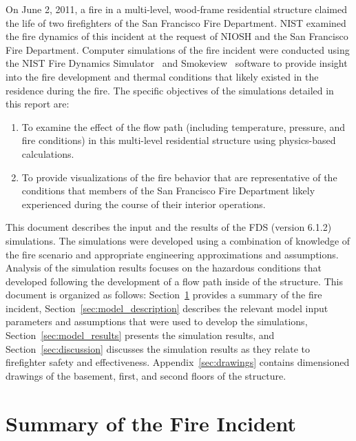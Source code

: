 \documentclass[12pt,oneside]{book}
\begin{document}
On June 2, 2011, a fire in a multi-level, wood-frame residential structure claimed the life of two firefighters of the San Francisco Fire Department. NIST examined the fire dynamics of this incident at the request of NIOSH and the San Francisco Fire Department. Computer simulations of the fire incident were conducted using the NIST Fire Dynamics Simulator~\cite{FDS_Users_Guide} and Smokeview~\cite{Smokeview_Users_Guide} software to provide insight into the fire development and thermal conditions that likely existed in the residence during the fire. The specific objectives of the simulations detailed in this report are: 
\begin{enumerate}
\item To examine the effect of the flow path (including temperature, pressure, and fire conditions) in this multi-level residential structure using physics-based calculations.
\item To provide visualizations of the fire behavior that are representative of the conditions that members of the San Francisco Fire Department likely experienced during the course of their interior operations.
\end{enumerate}
This document describes the input and the results of the FDS (version 6.1.2) simulations. The simulations were developed using a combination of knowledge of the fire scenario and appropriate engineering approximations and assumptions. Analysis of the simulation results focuses on the hazardous conditions that developed following the development of a flow path inside of the structure. This document is organized as follows: Section~\ref{sec:incident_summary} provides a summary of the fire incident, Section~\ref{sec:model_description} describes the relevant model input parameters and assumptions that were used to develop the simulations, Section~\ref{sec:model_results} presents the simulation results, and Section~\ref{sec:discussion} discusses the simulation results as they relate to firefighter safety and effectiveness. Appendix~\ref{sec:drawings} contains dimensioned drawings of the basement, first, and second floors of the structure.


\chapter{Summary of the Fire Incident}
\label{sec:incident_summary}
\end{document}
